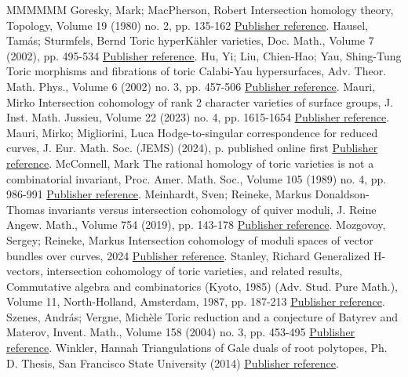 \documentclass[11pt]{article}
\theoremstyle{definition}
\numberwithin{equation}{section}
\begin{document}
\begin{thebibliography}{MMMMMM}
 Goresky, Mark; MacPherson, Robert Intersection homology theory, Topology, Volume 19 (1980) no. 2, pp. 135-162 \href{https://alco.centre-mersenne.org/articles/10.5802/alco.417/#GM}{Publisher reference}.
 Hausel, Tamás; Sturmfels, Bernd Toric hyperKähler varieties, Doc. Math., Volume 7 (2002), pp. 495-534 \href{https://alco.centre-mersenne.org/articles/10.5802/alco.417/#HSt}{Publisher reference}.
 Hu, Yi; Liu, Chien-Hao; Yau, Shing-Tung Toric morphisms and fibrations of toric Calabi-Yau hypersurfaces, Adv. Theor. Math. Phys., Volume 6 (2002) no. 3, pp. 457-506 \href{https://alco.centre-mersenne.org/articles/10.5802/alco.417/#Yau}{Publisher reference}.
 Mauri, Mirko Intersection cohomology of rank 2 character varieties of surface groups, J. Inst. Math. Jussieu, Volume 22 (2023) no. 4, pp. 1615-1654 \href{https://alco.centre-mersenne.org/articles/10.5802/alco.417/#Mauri}{Publisher reference}.
 Mauri, Mirko; Migliorini, Luca Hodge-to-singular correspondence for reduced curves, J. Eur. Math. Soc. (JEMS) (2024), p. published online first \href{https://alco.centre-mersenne.org/articles/10.5802/alco.417/#MM}{Publisher reference}.
 McConnell, Mark The rational homology of toric varieties is not a combinatorial invariant, Proc. Amer. Math. Soc., Volume 105 (1989) no. 4, pp. 986-991 \href{https://alco.centre-mersenne.org/articles/10.5802/alco.417/#McConnel}{Publisher reference}.
 Meinhardt, Sven; Reineke, Markus Donaldson-Thomas invariants versus intersection cohomology of quiver moduli, J. Reine Angew. Math., Volume 754 (2019), pp. 143-178 \href{https://alco.centre-mersenne.org/articles/10.5802/alco.417/#MeinRein}{Publisher reference}.
 Mozgovoy, Sergey; Reineke, Markus Intersection cohomology of moduli spaces of vector bundles over curves, 2024 \href{https://alco.centre-mersenne.org/articles/10.5802/alco.417/#MozgovoyRein}{Publisher reference}.
 Stanley, Richard Generalized H-vectors, intersection cohomology of toric varieties, and related results, Commutative algebra and combinatorics (Kyoto, 1985) (Adv. Stud. Pure Math.), Volume 11, North-Holland, Amsterdam, 1987, pp. 187-213 \href{https://alco.centre-mersenne.org/articles/10.5802/alco.417/#Stanley}{Publisher reference}.
 Szenes, András; Vergne, Michèle Toric reduction and a conjecture of Batyrev and Materov, Invent. Math., Volume 158 (2004) no. 3, pp. 453-495 \href{https://alco.centre-mersenne.org/articles/10.5802/alco.417/#SzV}{Publisher reference}.
 Winkler, Hannah Triangulations of Gale duals of root polytopes, Ph. D. Thesis, San Francisco State University (2014) \href{https://alco.centre-mersenne.org/articles/10.5802/alco.417/#HW}{Publisher reference}.
\end{thebibliography}
\end{document}
